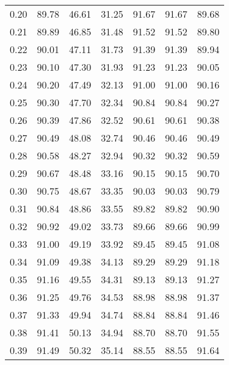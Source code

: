 \begin{tabular}{|c|c|c|c|c|c|c|}
      0.20 &     89.78 &     46.61 &      31.25 &   91.67 &      91.67 &         89.68 \\
      0.21 &     89.89 &     46.85 &      31.48 &   91.52 &      91.52 &         89.80 \\
      0.22 &     90.01 &     47.11 &      31.73 &   91.39 &      91.39 &         89.94 \\
      0.23 &     90.10 &     47.30 &      31.93 &   91.23 &      91.23 &         90.05 \\
      0.24 &     90.20 &     47.49 &      32.13 &   91.00 &      91.00 &         90.16 \\
      0.25 &     90.30 &     47.70 &      32.34 &   90.84 &      90.84 &         90.27 \\
      0.26 &     90.39 &     47.86 &      32.52 &   90.61 &      90.61 &         90.38 \\
      0.27 &     90.49 &     48.08 &      32.74 &   90.46 &      90.46 &         90.49 \\
      0.28 &     90.58 &     48.27 &      32.94 &   90.32 &      90.32 &         90.59 \\
      0.29 &     90.67 &     48.48 &      33.16 &   90.15 &      90.15 &         90.70 \\
      0.30 &     90.75 &     48.67 &      33.35 &   90.03 &      90.03 &         90.79 \\
      0.31 &     90.84 &     48.86 &      33.55 &   89.82 &      89.82 &         90.90 \\
      0.32 &     90.92 &     49.02 &      33.73 &   89.66 &      89.66 &         90.99 \\
      0.33 &     91.00 &     49.19 &      33.92 &   89.45 &      89.45 &         91.08 \\
      0.34 &     91.09 &     49.38 &      34.13 &   89.29 &      89.29 &         91.18 \\
      0.35 &     91.16 &     49.55 &      34.31 &   89.13 &      89.13 &         91.27 \\
      0.36 &     91.25 &     49.76 &      34.53 &   88.98 &      88.98 &         91.37 \\
      0.37 &     91.33 &     49.94 &      34.74 &   88.84 &      88.84 &         91.46 \\
      0.38 &     91.41 &     50.13 &      34.94 &   88.70 &      88.70 &         91.55 \\
      0.39 &     91.49 &     50.32 &      35.14 &   88.55 &      88.55 &         91.64 \\

\end{tabular}
